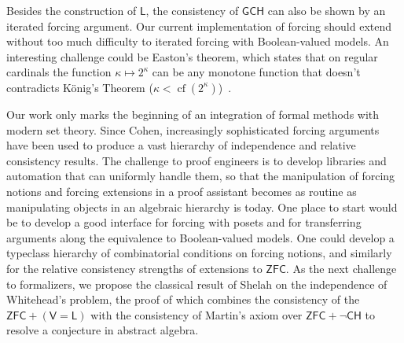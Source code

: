 \documentclass[sigplan,10pt,review, anonymous]{acmart}
\newcommand{\ZFC}{\mathsf{ZFC}}
\newcommand{\CH}{\mathsf{CH}}
\theoremstyle{definition}
\DeclareMathOperator{\cf}{cf}
\begin{document}

Besides the construction of \(\mathsf{L}\), the consistency of $\mathsf{GCH}$ can also be shown by an iterated forcing argument. Our current implementation of forcing should extend without too much difficulty to iterated forcing with Boolean-valued models.  %
An interesting challenge could be Easton's theorem, which states that on regular cardinals the function $\kappa\mapsto 2^\kappa$ can be any monotone function that doesn't contradicts K\"onig's Theorem ($\kappa<\cf(2^\kappa)$)~\cite{easton1970powers}.

Our work only marks the beginning of an integration of formal methods with modern set theory. Since Cohen, increasingly sophisticated forcing arguments have been used to produce a vast hierarchy of independence and relative consistency results. The challenge to proof engineers is to develop libraries and automation that can uniformly handle them, so that the manipulation of forcing notions and forcing extensions in a proof assistant becomes as routine as manipulating objects in an algebraic hierarchy is today. One place to start would be to develop a good interface for forcing with posets and for transferring arguments along the equivalence to Boolean-valued models. One could develop a typeclass hierarchy of combinatorial conditions on forcing notions, and similarly for the relative consistency strengths of extensions to \(\ZFC\).
As the next challenge to formalizers, we propose the classical result of Shelah \cite{shelah1974infinite} on the independence of Whitehead's problem, the proof of which combines the consistency of the \(\mathsf{ZFC} + (\mathsf{V} = \mathsf{L})\) with the consistency of Martin's axiom over \(\ZFC + \neg \CH\) \cite{martin1970internal} to resolve a conjecture in abstract algebra.

\end{document}
